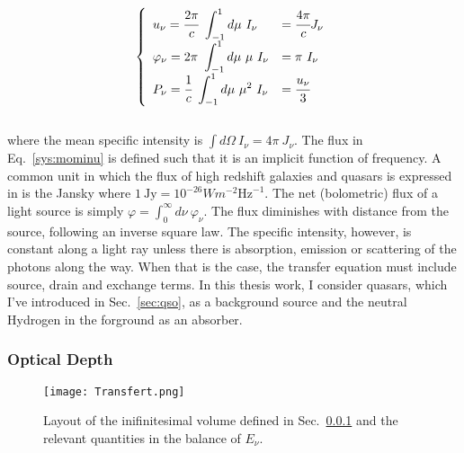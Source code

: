\begin{equation}
\label{sys:mominu}
\left\{
\begin{array}{ll}
u_\nu = \cfrac{2\pi}{c}~ \displaystyle \int_{-1}^{1} d\mu ~I_\nu & = \cfrac{4\pi}{c} J_\nu \\
\varphi_\nu = 2\pi~ \displaystyle \int_{-1}^{1} d\mu ~\mu ~I_\nu & = \pi ~ I_\nu \\
P_\nu = \cfrac{1}{c}~ \displaystyle \int_{-1}^{1} d\mu ~\mu^2 ~I_\nu & = \cfrac{u_\nu}{3}
\end{array}
\right.
\end{equation} \\ where the mean specific intensity is $\displaystyle \int d\Omega ~I_\nu = 4\pi~J_\nu$. The flux in Eq.~\ref{sys:mominu} is defined such that it is an implicit function of frequency. A common unit in which the flux of high redshift galaxies and quasars is expressed in is the Jansky where $1 ~\mathrm{Jy} = 10^{-26} W m^{-2} \mathrm{Hz}^{-1}$. The net (bolometric) flux of a light source is simply $\varphi = \displaystyle \int_0^\infty d\nu~\varphi_\nu$. The flux diminishes with distance from the source, following an inverse square law. The specific intensity, however, is constant along a light ray unless there is absorption, emission or scattering of the photons along the way. When that is the case, the transfer equation must include source, drain and exchange terms. In this thesis work, I consider quasars, which I've introduced in Sec.~\ref{sec:qso}, as a background source and the neutral Hydrogen in the forground as an absorber.

\subsubsection{Optical Depth}
\label{sec:optdep}

\begin{figure}
\begin{center}
\texttt{[image: Transfert.png]}
\caption{Layout of the inifinitesimal volume defined in Sec.~\ref{sec:optdep} and the relevant quantities in the balance of $E_\nu$.}
\label{fig:transfer}
\end{center}
\end{figure}

